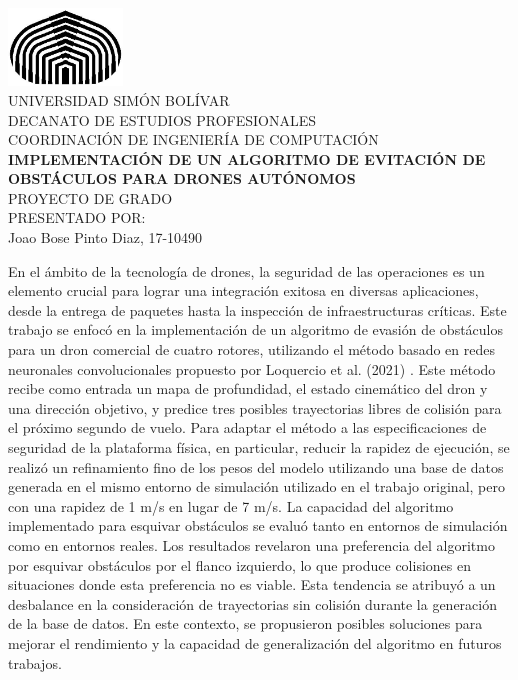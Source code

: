 \begin{titlepage}
    \begin{center}

        \includegraphics[width=1.2in]{partes/usb.png} \\
        \textsc {\large UNIVERSIDAD SIMÓN BOLÍVAR} \\
        \textsc{DECANATO DE ESTUDIOS PROFESIONALES\\
        COORDINACIÓN DE INGENIERÍA DE COMPUTACIÓN}\\ 
        \vfill
        \textbf{IMPLEMENTACIÓN DE UN ALGORITMO DE EVITACIÓN DE OBSTÁCULOS PARA DRONES AUTÓNOMOS} \\
        \vfill
        PROYECTO DE GRADO \\
        PRESENTADO POR: \\
        Joao Bose Pinto Diaz, 17-10490

    \end{center}
\vspace{-0.25cm}
\abstract
{   

En el ámbito de la tecnología de drones, la seguridad de las operaciones es un elemento crucial para lograr una integración exitosa en diversas aplicaciones, desde la entrega de paquetes hasta la inspección de infraestructuras críticas. Este trabajo se enfocó en la implementación de un algoritmo de evasión de obstáculos para un dron comercial de cuatro rotores, utilizando el método basado en redes neuronales convolucionales propuesto por Loquercio et al. (2021) \cite{Loquercio2021}. Este método recibe como entrada un mapa de profundidad, el estado cinemático del dron y una dirección objetivo, y predice tres posibles trayectorias libres de colisión para el próximo segundo de vuelo. Para adaptar el método a las especificaciones de seguridad de la plataforma física, en particular, reducir la rapidez de ejecución, se realizó un refinamiento fino de los pesos del modelo utilizando una base de datos generada en el mismo entorno de simulación utilizado en el trabajo original, pero con una rapidez de 1 m/s en lugar de 7 m/s. La capacidad del algoritmo implementado para esquivar obstáculos se evaluó tanto en entornos de simulación como en entornos reales. Los resultados revelaron una preferencia del algoritmo por esquivar obstáculos por el flanco izquierdo, lo que produce colisiones en situaciones donde esta preferencia no es viable. Esta tendencia se atribuyó a un desbalance en la consideración de trayectorias sin colisión durante la generación de la base de datos. En este contexto, se propusieron posibles soluciones para mejorar el rendimiento y la capacidad de generalización del algoritmo en futuros trabajos.

}
\end{titlepage}

